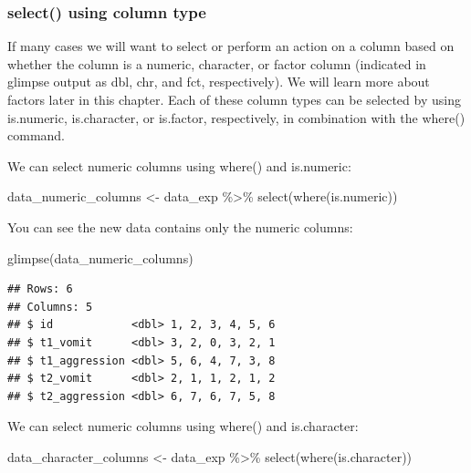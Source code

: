 \documentclass[
]{krantz}
\makeatletter
\newenvironment{Shaded}{\begin{snugshade}}{\end{snugshade}}
\newcommand{\FunctionTok}[1]{\textcolor[rgb]{0,0,0}{#1}}
\newcommand{\NormalTok}[1]{#1}
\newcommand{\OtherTok}[1]{\textcolor[rgb]{0.37,0.37,0.37}{#1}}
\newcommand{\SpecialCharTok}[1]{\textcolor[rgb]{0,0,0}{#1}}
\newenvironment{kframe}{%
\medskip{}
\setlength{\fboxsep}{.8em}
 \def\at@end@of@kframe{}%
 \ifinner\ifhmode%
  \def\at@end@of@kframe{\end{minipage}}%
  \begin{minipage}{\columnwidth}%
 \fi\fi%
 \def\FrameCommand##1{\hskip\@totalleftmargin \hskip-\fboxsep
 \colorbox{shadecolor}{##1}\hskip-\fboxsep
     \hskip-\linewidth \hskip-\@totalleftmargin \hskip\columnwidth}%
 \MakeFramed {\advance\hsize-\width
   \@totalleftmargin\z@ \linewidth\hsize
   \@setminipage}}%
 {\par\unskip\endMakeFramed%
 \at@end@of@kframe}
\renewenvironment{Shaded}{\begin{kframe}}{\end{kframe}}
\makeatother
\begin{document}
\hypertarget{select-using-column-type}{%
\subsubsection{select() using column type}\label{select-using-column-type}}

If many cases we will want to select or perform an action on a column based on whether the column is a numeric, character, or factor column (indicated in glimpse output as dbl, chr, and fct, respectively). We will learn more about factors later in this chapter. Each of these column types can be selected by using is.numeric, is.character, or is.factor, respectively, in combination with the where() command.

We can select numeric columns using where() and is.numeric:

\begin{Shaded}
\begin{Highlighting}[]
\NormalTok{data\_numeric\_columns }\OtherTok{\textless{}{-}}\NormalTok{ data\_exp }\SpecialCharTok{\%\textgreater{}\%} 
  \FunctionTok{select}\NormalTok{(}\FunctionTok{where}\NormalTok{(is.numeric))}
\end{Highlighting}
\end{Shaded}

You can see the new data contains only the numeric columns:

\begin{Shaded}
\begin{Highlighting}[]
\FunctionTok{glimpse}\NormalTok{(data\_numeric\_columns)}
\end{Highlighting}
\end{Shaded}

\begin{verbatim}
## Rows: 6
## Columns: 5
## $ id            <dbl> 1, 2, 3, 4, 5, 6
## $ t1_vomit      <dbl> 3, 2, 0, 3, 2, 1
## $ t1_aggression <dbl> 5, 6, 4, 7, 3, 8
## $ t2_vomit      <dbl> 2, 1, 1, 2, 1, 2
## $ t2_aggression <dbl> 6, 7, 6, 7, 5, 8
\end{verbatim}

We can select numeric columns using where() and is.character:

\begin{Shaded}
\begin{Highlighting}[]
\NormalTok{data\_character\_columns }\OtherTok{\textless{}{-}}\NormalTok{ data\_exp }\SpecialCharTok{\%\textgreater{}\%} 
  \FunctionTok{select}\NormalTok{(}\FunctionTok{where}\NormalTok{(is.character))}
\end{Highlighting}
\end{Shaded}
\end{document}
